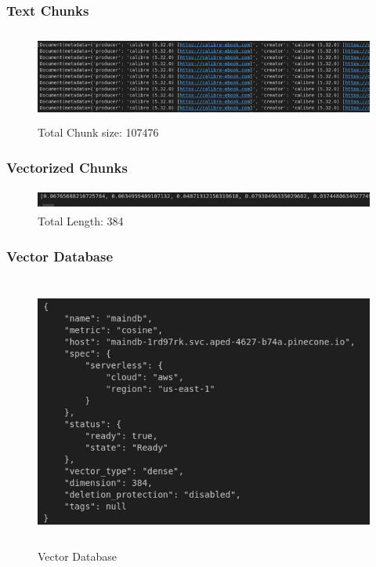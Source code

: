 \documentclass[12pt,a4paper]{report}
\begin{document}
\subsubsection{Text Chunks}
\begin{figure}[H]
    \centering
    \includegraphics[width=15cm, height=3cm]{TextChunks}
    \caption{Total Chunk size: 107476}
    \label{fig:Text Chunks}
\end{figure}


\subsubsection{Vectorized Chunks}
\begin{figure}[H]
    \centering
    \includegraphics[width=15cm, height=0.7cm]{VectorizedChunks}
    \caption{Total Length: 384}
    \label{fig:Vectorized Chunks}
\end{figure}


\subsubsection{Vector Database}
\begin{figure}[H]
    \centering
    \includegraphics[width=15cm, height=9cm]{VectorDatabase}
    \caption{Vector Database}
    \label{fig:Vector Database}
\end{figure}
\end{document}
